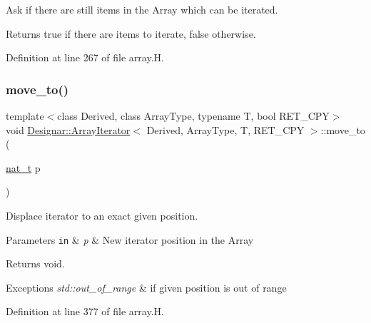 Ask if there are still items in the Array which can be iterated. 

\begin{DoxyReturn}{Returns}
{\ttfamily true} if there are items to iterate, {\ttfamily false} otherwise. 
\end{DoxyReturn}


Definition at line 267 of file array.\+H.

\mbox{\label{class_designar_1_1_array_iterator_a68f6d13686360c93d95b3a875b14312e}} 
\subsubsection{\texorpdfstring{move\+\_\+to()}{move\_to()}}
{\footnotesize\ttfamily template$<$class Derived, class Array\+Type, typename T, bool R\+E\+T\+\_\+\+C\+PY$>$ \\
void \hyperlink{class_designar_1_1_array_iterator}{Designar\+::\+Array\+Iterator}$<$ Derived, Array\+Type, T, R\+E\+T\+\_\+\+C\+PY $>$\+::move\+\_\+to (\begin{DoxyParamCaption}\item[{\hyperlink{namespace_designar_aa72662848b9f4815e7bf31a7cf3e33d1}{nat\+\_\+t}}]{p }\end{DoxyParamCaption})\hspace{0.3cm}{\ttfamily [inline]}}



Displace iterator to an exact given position. 


\begin{DoxyParams}[1]{Parameters}
\mbox{\tt in}  & {\em p} & New iterator position in the Array \\
\hline
\end{DoxyParams}
\begin{DoxyReturn}{Returns}
void. 
\end{DoxyReturn}

\begin{DoxyExceptions}{Exceptions}
{\em std\+::out\+\_\+of\+\_\+range} & if given position is out of range \\
\hline
\end{DoxyExceptions}


Definition at line 377 of file array.\+H.

